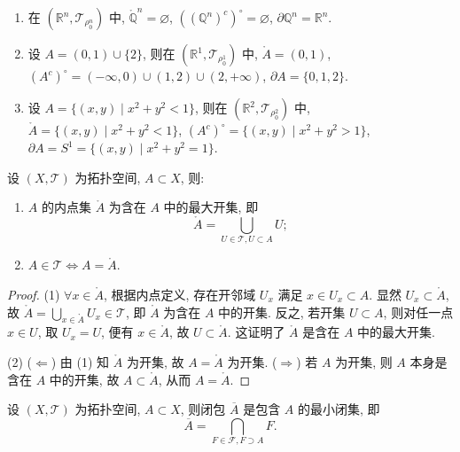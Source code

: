 \begin{example}\label{ex:7.1.10}
\begin{enumerate}
  \item 在 $(\mathbb{R}^n, \mathcal{T}_{\rho_0^n})$ 中, $\mathring{\mathbb{Q}}^n = \varnothing$, $((\mathbb{Q}^n)^c)^\circ = \varnothing$, $\partial \mathbb{Q}^n = \mathbb{R}^n$.
  \item 设 $A = (0, 1) \cup \{2\}$, 则在 $(\mathbb{R}^1, \mathcal{T}_{\rho_0^1})$ 中, $\mathring{A} = (0, 1)$, $(A^c)^\circ = (-\infty, 0) \cup (1, 2) \cup (2, +\infty)$, $\partial A = \{0, 1, 2\}$.
  \item 设 $A = \{(x, y) \mid x^2 + y^2 < 1\}$, 则在 $(\mathbb{R}^2, \mathcal{T}_{\rho_0^2})$ 中, $\mathring{A} = \{(x, y) \mid x^2 + y^2 < 1\}$, $(A^c)^\circ = \{(x, y) \mid x^2 + y^2 > 1\}$, $\partial A = S^1 = \{(x, y) \mid x^2 + y^2 = 1\}$.
\end{enumerate}
\end{example}

\begin{theorem}\label{thm:7.1.10}
设 $(X, \mathcal{T})$ 为拓扑空间, $A \subset X$, 则:
\begin{enumerate}
  \item $A$ 的内点集 $\mathring{A}$ 为含在 $A$ 中的最大开集, 即
  \[
    \mathring{A} = \bigcup_{U \in \mathcal{T}, U \subset A} U;
  \]
  \item $A \in \mathcal{T} \iff A = \mathring{A}$.
\end{enumerate}
\end{theorem}

\begin{proof}
(1) $\forall x \in \mathring{A}$, 根据内点定义, 存在开邻域 $U_x$ 满足 $x \in U_x \subset A$. 显然 $U_x \subset \mathring{A}$, 故 $\mathring{A} = \bigcup_{x \in \mathring{A}} U_x \in \mathcal{T}$, 即 $\mathring{A}$ 为含在 $A$ 中的开集. 反之, 若开集 $U \subset A$, 则对任一点 $x \in U$, 取 $U_x = U$, 便有 $x \in \mathring{A}$, 故 $U \subset \mathring{A}$. 这证明了 $\mathring{A}$ 是含在 $A$ 中的最大开集.

(2) ($\Leftarrow$) 由 (1) 知 $\mathring{A}$ 为开集, 故 $A = \mathring{A}$ 为开集. ($\Rightarrow$) 若 $A$ 为开集, 则 $A$ 本身是含在 $A$ 中的开集, 故 $A \subset \mathring{A}$, 从而 $A = \mathring{A}$. \qedhere
\end{proof}

\begin{theorem}\label{thm:7.1.11}
设 $(X, \mathcal{T})$ 为拓扑空间, $A \subset X$, 则闭包 $\overline{A}$ 是包含 $A$ 的最小闭集, 即
\[
  \overline{A} = \bigcap_{F \in \mathcal{F}, F \supset A} F.
\]
\end{theorem}

